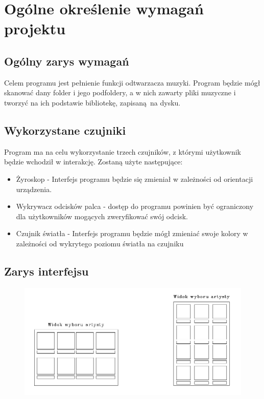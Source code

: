 	\newpage
\section{Ogólne określenie wymagań projektu}		%

\subsection{Ogólny zarys wymagań}

Celem programu jest pełnienie funkcji odtwarzacza muzyki. Program będzie mógł skanować dany folder i jego podfoldery, a w nich zawarty pliki muzyczne i tworzyć na ich podstawie bibliotekę, zapisaną na dysku.  

\subsection{Wykorzystane czujniki}

Program ma na celu wykorzystanie trzech czujników, z którymi użytkownik będzie wchodził w interakcję. Zostaną użyte następujące:

\begin{itemize}
	\item Żyroskop - Interfejs programu będzie się zmieniał w zależności od orientacji urządzenia. 
	
	\item Wykrywacz odcisków palca - dostęp do programu powinien być ograniczony dla użytkowników mogących zweryfikować swój odcisk.

	\item Czujnik światła - Interfejs programu będzie mógł zmieniać swoje kolory w zależności od wykrytego poziomu światła na czujniku
\end{itemize}

\subsection{Zarys interfejsu}


\begin{figure}[H]
	\centering
	\includegraphics[width=1\linewidth]{images/mockup2_artysta}
	\caption{}
	\label{fig:mockup2artysta}
\end{figure}


